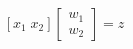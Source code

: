 \documentclass[preview]{standalone}
\begin{document}
\begin{align*}
\left[x_1 \; x_2\right]\begin{bmatrix} w_1 \\ w_2 \end{bmatrix} = z
\end{align*}
\end{document}
